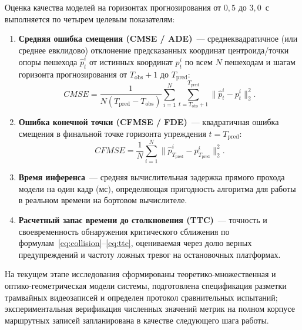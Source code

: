 \documentclass{misisarticle}
\begin{document}
Оценка качества моделей на горизонтах прогнозирования от $0{,}5$ до $3{,}0$~с выполняется по четырем целевым показателям:
\begin{enumerate}
  \item \textbf{Средняя ошибка смещения (CMSE / ADE)}~--- среднеквадратичное (или среднее евклидово) отклонение предсказанных координат центроида/точки опоры пешехода $\hat{p}_t^i$ от истинных координат $p_t^i$ по всем $N$ пешеходам и шагам горизонта прогнозирования от $T_{\text{obs}}+1$ до $T_{\text{pred}}$:
  \begin{equation}
    CMSE = \frac{1}{N (T_{\text{pred}} - T_{\text{obs}})} \sum_{i=1}^{N} \sum_{t=T_{\text{obs}}+1}^{T_{\text{pred}}} \|\hat{p}_t^i - p_t^i\|_2^2.
    \label{eq:cmse}
  \end{equation}
  \item \textbf{Ошибка конечной точки (CFMSE / FDE)}~--- квадратичная ошибка смещения в финальной точке горизонта упреждения $t = T_{\text{pred}}$:
  \begin{equation}
    CFMSE = \frac{1}{N} \sum_{i=1}^{N} \|\hat{p}_{T_{\text{pred}}}^i - p_{T_{\text{pred}}}^i\|_2^2.
    \label{eq:cfmse}
  \end{equation}
  \item \textbf{Время инференса}~--- средняя вычислительная задержка прямого прохода модели на один кадр (мс), определяющая пригодность алгоритма для работы в реальном времени на бортовом вычислителе.
  \item \textbf{Расчетный запас времени до столкновения (TTC)}~--- точность и своевременность обнаружения критического сближения по формулам~\eqref{eq:collision}--\eqref{eq:ttc}, оцениваемая через долю верных предупреждений и частоту ложных тревог на остановочных платформах.
\end{enumerate}

На текущем этапе исследования сформированы теоретико-множественная и оптико-геометрическая модели системы, подготовлена спецификация разметки трамвайных видеозаписей и определен протокол сравнительных испытаний; экспериментальная верификация численных значений метрик на полном корпусе маршрутных записей запланирована в качестве следующего шага работы.
\end{document}
